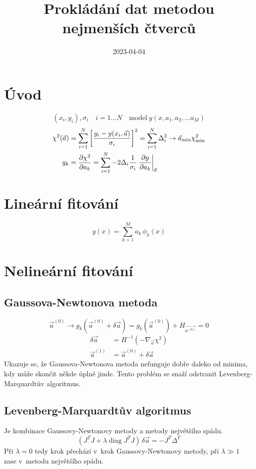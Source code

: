 \documentclass[a4paper]{article}
\title{Prokládání dat metodou nejmenších čtverců}
\date{2023-04-04}
\begin{document}
\section{Úvod}
\begin{equation}
    (x_i, y_i), \sigma_i \quad i = 1 \dots N
    \quad \text{model}\ y(x, a_1, a_2, \dots a_M)
\end{equation}
\begin{align}
    \chi^2(\vec{a})
    &= \sum_{i = 1}^{N} \left[\frac{y_i - y(x_i, \vec{a})}{\sigma_i}\right]^2
    = \sum_{i = 1}^{N} \Delta^2_i
    \rightarrow \vec{a}_\text{min} \chi^2_\text{min}
    \\
    g_k &= \pdv{\chi^2}{a_k}
    = \sum_{i=1}^{N} -2\Delta_i \frac{1}{\sigma_i}\eval{\pdv{y}{a_k}}_{\vec{a}}
\end{align}

\section{Lineární fitování}
\begin{equation}
    y(x) = \sum_{k=1}^{M} a_k \, \phi_k(x)
\end{equation}

\section{Nelineární fitování}
\subsection{Gaussova-Newtonova metoda}
\begin{equation}
    \vec{a}^{(0)} \rightarrow g_k(\vec{a}^{(0)} + \delta\vec{a})
    = g_k(\vec{a}^{(0)}) + H_{\vec{a^{(0)}}} = 0
\end{equation}
\begin{align}
    \delta\vec{a} &= H^{-1}(-\nabla_{\vec{a}} \chi^2) \\
    \vec{a}^{(1)} &= \vec{a}^{(0)} + \delta\vec{a}
\end{align}
Ukazuje se, že Gaussova-Newtonova metoda nefunguje dobře daleko od minima,
kdy může skončit někde úplně jinde.
Tento problém se snaží odstranit Levenberg-Marquardtův algoritmus.

\subsection{Levenberg-Marquardtův algoritmus}
Je kombinace Gaussovy-Newtonovy metody a metody největšího spádu.
\begin{equation}
    (J^TJ + \lambda \operatorname{diag}J^TJ) \, \delta\vec{a} = -J^T\Delta^T
\end{equation}
Při $\lambda = 0$ tedy krok přechází v~krok Gaussovy-Newtonovy metody,
při $\lambda \gg 1$ zase v~metodu největšího spádu.
\end{document}
